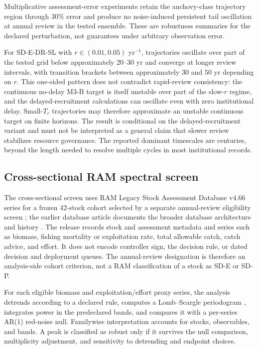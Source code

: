 \documentclass[11pt]{article}
\begin{document}
Multiplicative assessment-error experiments retain the anchovy-class trajectory region through $30\%$ error and produce no noise-induced persistent tail oscillation at annual review in the tested ensemble. These are robustness summaries for the declared perturbation, not guarantees under arbitrary observation error.

For SD-E-DR-SL with $r\in(0.01,0.05)$ yr$^{-1}$, trajectories oscillate over part of the tested grid below approximately $20$--$30$ yr and converge at longer review intervals, with transition brackets between approximately $30$ and $50$ yr depending on $r$. This one-sided pattern does not contradict rapid-review consistency: the continuous no-delay M3-B target is itself unstable over part of the slow-$r$ regime, and the delayed-recruitment calculations can oscillate even with zero institutional delay. Small-$T_r$ trajectories may therefore approximate an unstable continuous target on finite horizons. The result is conditional on the delayed-recruitment variant and must not be interpreted as a general claim that slower review stabilizes resource governance. The reported dominant timescales are centuries, beyond the length needed to resolve multiple cycles in most institutional records.

\subsection{Cross-sectional RAM spectral screen}

The cross-sectional screen uses RAM Legacy Stock Assessment Database v4.66 series for a frozen 42-stock cohort selected by a separate annual-review eligibility screen \cite{ram2024}; the earlier database article documents the broader database architecture and history \cite{ricard2012}. The release records stock and assessment metadata and series such as biomass, fishing mortality or exploitation rate, total allowable catch, catch advice, and effort. It does not encode controller sign, the decision rule, or dated decision and deployment queues. The annual-review designation is therefore an analysis-side cohort criterion, not a RAM classification of a stock as SD-E or SD-P.

For each eligible biomass and exploitation/effort proxy series, the analysis detrends according to a declared rule, computes a Lomb--Scargle periodogram \cite{vanderplas2018}, integrates power in the predeclared bands, and compares it with a per-series AR(1) red-noise null. Familywise interpretation accounts for stocks, observables, and bands. A peak is classified as robust only if it survives the null comparison, multiplicity adjustment, and sensitivity to detrending and endpoint choices.
\end{document}
